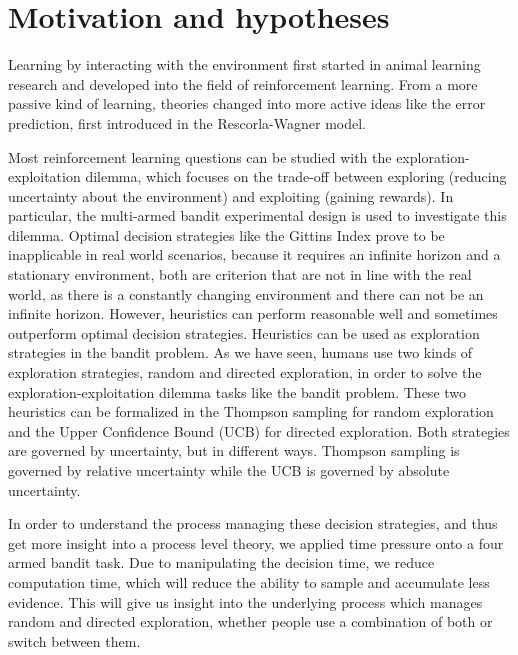 \section{Motivation and hypotheses}
Learning by interacting with the environment first started in animal learning research and developed into the field of reinforcement learning. From a more passive kind of learning, theories changed into more active ideas like the error prediction, first introduced in the Rescorla-Wagner model. 

Most reinforcement learning questions can be studied with the exploration-exploitation dilemma, which focuses on the trade-off between exploring (reducing uncertainty about the environment) and exploiting (gaining rewards). In particular, the multi-armed bandit experimental design is used to investigate this dilemma. Optimal decision strategies like the Gittins Index prove to be inapplicable in real world scenarios, because it requires an infinite horizon and a stationary environment, both are criterion that are not in line with the real world, as there is a constantly changing environment and there can not be an infinite horizon. However, heuristics can perform reasonable well and sometimes outperform optimal decision strategies. Heuristics can be used as exploration strategies in the bandit problem.
As we have seen, humans use two kinds of exploration strategies, random and directed exploration, in order to solve the exploration-exploitation dilemma tasks like the bandit problem. These two heuristics can be formalized in the Thompson sampling for random exploration and the Upper Confidence Bound (UCB) for directed exploration. Both strategies are governed by uncertainty, but in different ways. Thompson sampling is governed by relative uncertainty while the UCB is governed by absolute uncertainty.

In order to understand the process managing these decision strategies, and thus get more insight into a process level theory, we applied time pressure onto a four armed bandit task. Due to manipulating the decision time, we reduce computation time, which will reduce the ability to sample and accumulate less evidence. This will give us insight into the underlying process which manages random and directed exploration, whether people use a combination of both or switch between them. 

\newpage




%